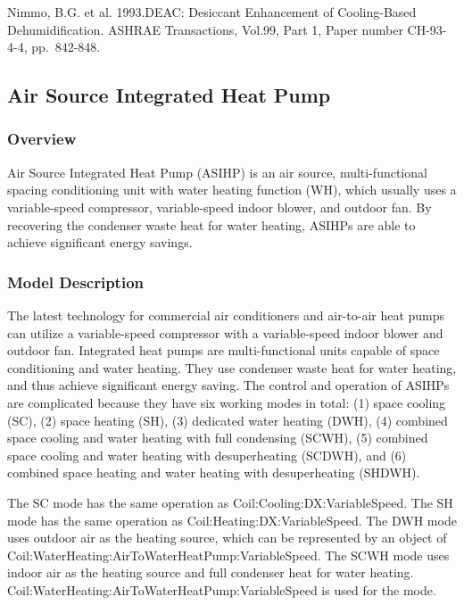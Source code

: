 Nimmo, B.G. et al. 1993.DEAC: Desiccant Enhancement of Cooling-Based Dehumidification. ASHRAE Transactions, Vol.99, Part 1, Paper number CH-93-4-4, pp.~842-848.


\subsection{Air Source Integrated Heat Pump}\label{Air-Source-Integrated-Heat-Pump-Section}

\subsubsection{Overview}\label{overview-ASIHP}

Air Source Integrated Heat Pump (ASIHP) is an air source, multi-functional spacing conditioning unit with water heating function (WH), which usually uses a variable-speed compressor, variable-speed indoor blower, and outdoor fan. By recovering the condenser waste heat for water heating, ASIHPs are able to achieve significant energy savings.

\subsubsection{Model Description}\label{model-description-ASIHP}

The latest technology for commercial air conditioners and air-to-air heat pumps can utilize a variable-speed compressor with a variable-speed indoor blower and outdoor fan. Integrated heat pumps are multi-functional units capable of space conditioning and water heating. They use condenser waste heat for water heating, and thus achieve significant energy saving. The control and operation of ASIHPs are complicated because they have six working modes in total:  (1) space cooling (SC), (2) space heating (SH), (3) dedicated water heating (DWH), (4) combined space cooling and water heating with full condensing (SCWH), (5) combined space cooling and water heating with desuperheating (SCDWH), and (6) combined space heating and water heating with desuperheating (SHDWH).

The SC mode has the same operation as Coil:Cooling:DX:VariableSpeed. The SH mode has the same operation as Coil:Heating:DX:VariableSpeed. The DWH mode uses outdoor air as the heating source, which can be represented by an object of Coil:WaterHeating:AirToWaterHeatPump:VariableSpeed. The SCWH mode uses indoor air as the heating source and full condenser heat for water heating.  Coil:WaterHeating:AirToWaterHeatPump:VariableSpeed is used for the mode.

